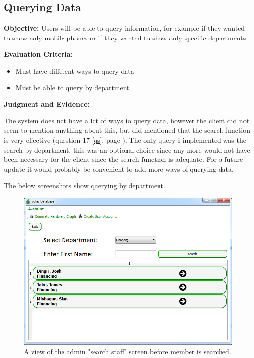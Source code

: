 \subsection{Querying Data}\label{queryf}

\textbf{Objective:} Users will be able to query information, for example if they wanted to show only mobile phones or if they wanted to show only specific departments.

\textbf{Evaluation Criteria:}
\begin{itemize}
\item{Must have different ways to query data}
\item{Must be able to query by department}
\end{itemize}

\textbf{Judgment and Evidence:}

The system does not have a lot of ways to query data, however the client did not seem to mention anything about this, but did mentioned that the search function is very effective (question 17 \ref{qs}, page \pageref{qs}). The only query I implemented was the search by department, this was an optional choice since any more would not have been necessary for the client since the search function is adequate. For a future update it would probably be convenient to add more ways of querying data.

The below screenshots show querying by department.

\begin{figure}[H]
    \includegraphics[width=\textwidth]{./Evaluation/Images/beforeadv.png}
    \caption{A view of the admin "search staff" screen before member is searched.} 
\end{figure}

